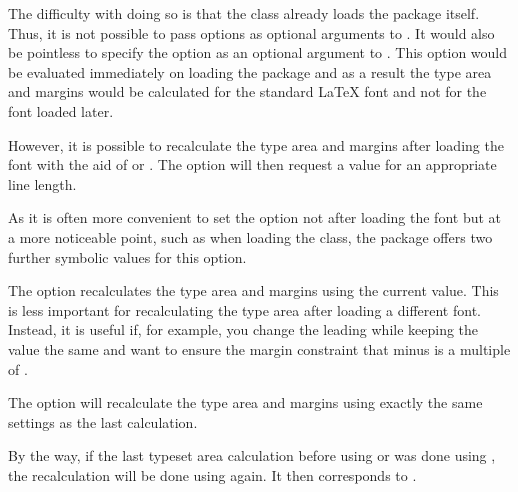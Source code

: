\begin{Explain}
  The difficulty with doing so is that the {\KOMAScript} class already loads
  the  package itself. Thus, it is not possible to pass
  options as optional arguments to . It
  would also be pointless to specify the
   option as an optional argument to
  .  This option would be evaluated
  immediately on loading the  package and as a result the
  type area and margins would be calculated for the standard {\LaTeX} font and
  not for the font loaded later.

  However, it is possible to recalculate the type area and margins after
  loading the font with the aid of %
   or
  . The option
   will then request a  value for an
  appropriate line length.

  As it is often more convenient to set the  option not after
  loading the font but at a more noticeable point, such as when loading the
  class, the  package offers two further symbolic values for
  this option.
\end{Explain}

The option 
recalculates the type area and margins using the current  value. 
This is less important for recalculating the type area after loading a 
different font. Instead, it is useful if, for example, you change the
leading while keeping the  value the same and want to ensure the 
margin constraint that  minus  is a 
multiple of .

The option  will
recalculate the type area and margins using exactly the same settings as the
last calculation.

By the way, if the last typeset area calculation before using
 or  was done using
, the recalculation will be
done using  again. It then corresponds to
%
.

